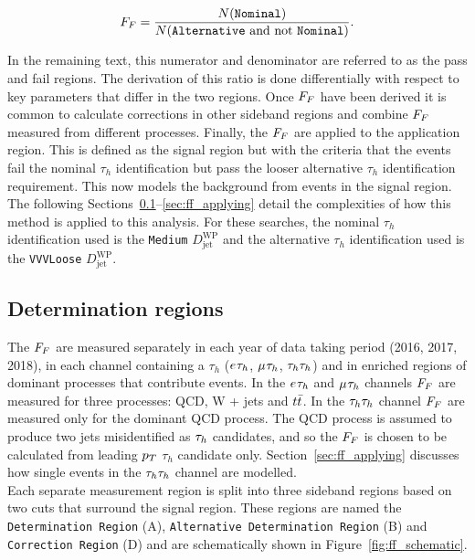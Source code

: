 \begin{equation}
F_{F} = \frac{N(\texttt{Nominal})}{N(\texttt{Alternative}\text{ and not }\texttt{Nominal})}.
\label{eqn:ff}
\end{equation}

In the remaining text, this numerator and denominator are referred to as the pass and fail regions.
The derivation of this ratio is done differentially with respect to key parameters that differ in the two regions.
Once $F_{F}$ have been derived it is common to calculate corrections in other sideband regions and combine $F_{F}$ measured from different processes.
Finally, the $F_{F}$ are applied to the application region. 
This is defined as the signal region but with the criteria that the \jtth events fail the nominal $\tau_h$ identification but pass the looser alternative $\tau_h$ identification requirement.
This now models the background from \jtth events in the signal region. \\

The following Sections~\ref{sec:ff_dr}--\ref{sec:ff_applying} detail the complexities of how this method is applied to this analysis.
For these searches, the nominal $\tau_h$ identification used is the \texttt{Medium} $D_{\text{jet}}^{\text{WP}}$ and the alternative $\tau_h$ identification used is the \texttt{VVVLoose} $D_{\text{jet}}^{\text{WP}}$.

\subsection{Determination regions}
\label{sec:ff_dr}

The $F_{F}$ are measured separately in each year of data taking period (2016, 2017, 2018), in each channel containing a $\tau_h$ ($e_{}\tau_{h}$, $\mu_{}\tau_{h}$, $\tau_{h}\tau_{h}$) and in enriched regions of dominant processes that contribute \jtth events.
In the $e_{}\tau_{h}$ and $\mu_{}\tau_{h}$ channels $F_{F}$ are measured for three processes: \ac{QCD}, W + jets and $t\bar{t}$.
In the $\tau_{h}\tau_{h}$ channel $F_{F}$ are measured only for the dominant \ac{QCD} process.
The \ac{QCD} process is assumed to produce two jets misidentified as $\tau_{h}$ candidates, and so the $F_{F}$ is chosen to be calculated from leading $p_{T}$ $\tau_h$ candidate only.
Section~\ref{sec:ff_applying} discusses how single \jtth events in the $\tau_{h}\tau_{h}$ channel are modelled. \\

Each separate measurement region is split into three sideband regions based on two cuts that surround the signal region.
These regions are named the \texttt{Determination Region} (A), \texttt{Alternative Determination Region} (B) and \texttt{Correction Region} (D) and are schematically shown in Figure~\ref{fig:ff_schematic}. \\

